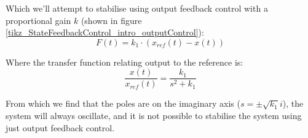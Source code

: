 \documentclass[  10pt, twoside]{report} %
\numberwithin{equation}{chapter}
\begin{document}
Which we'll attempt to stabilise using output feedback control with a proportional gain $k$ (shown in figure \ref{tikz_StateFeedbackControl_intro_outputControl}):
\begin{equation}
    F(t) = k _1\cdot ( x_{ref}(t) - x(t))
\end{equation}

Where the transfer function relating output to the reference is:
\begin{equation}
    \frac{x(t)}{x_{ref}(t)} = \frac{k_1}{s^2 + k_1}
\end{equation}

From which we find that the poles are on the imaginary axis ($s=\pm\sqrt{k_1}i$), the system will always oscillate, and it is not possible to stabilise the system using just output feedback control.



\end{document}
